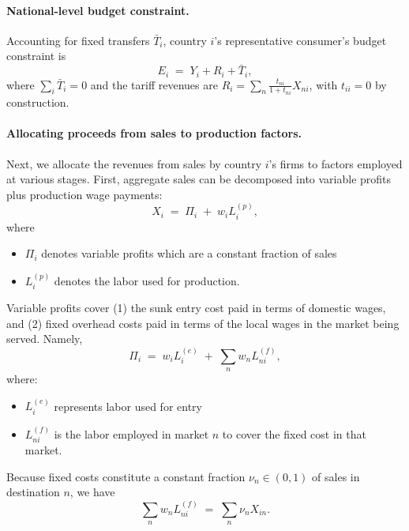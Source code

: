 \documentclass[12pt]{article}
\begin{document}
\paragraph{National-level budget constraint.}
Accounting for fixed transfers $\bar T_i$, country $i$'s representative consumer's budget constraint is
\begin{equation}
    E_i \;=\; Y_i + R_i + \bar T_i, 
    \label{eq:HH_budget}
\end{equation}
where $\sum_i \bar T_i = 0$ and the tariff revenues are $R_{i}=\sum_{n}\frac{t_{ni}}{1+t_{ni}}X_{ni}$, with $t_{ii}=0$ by construction.
\paragraph{Allocating proceeds from sales to production factors.}
Next, we allocate the revenues from sales by country $i$'s firms to factors employed at various stages. First, aggregate sales can be decomposed into variable profits plus production wage payments:
\begin{equation}
    X_i \;=\; \Pi_i \;+\; w_i L_i^{(p)},
    \label{eq:sales_split}
\end{equation}
where 
\begin{itemize}
    \item $\Pi_{i}$ denotes variable profits which are a constant fraction of sales
    \item $L_{i}^{(p)}$ denotes the labor used for production.
\end{itemize}
Variable profits cover (1) the sunk entry cost paid in terms of domestic wages, and (2) fixed overhead costs paid in terms of the local wages in the market being served. Namely,
\begin{equation}
    \Pi_i \;=\; w_i L_i^{(e)} \;+\; \sum_{n} w_n L_{ni}^{(f)},
    \label{eq:profits_split}
\end{equation}
where: 
\begin{itemize}
    \item $L_i^{(e)}$ represents labor used for entry
    \item $L_{ni}^{(f)}$ is the labor employed in market $n$ to cover the fixed cost in that market. 
\end{itemize}
Because fixed costs constitute a constant fraction $\nu_n\in(0,1)$ of sales in destination $n$, we have
\begin{equation}
    \sum_{n} w_n L_{ni}^{(f)} \;=\; \sum_{n} \nu_n X_{in}.
    \label{eq:fixedcost_prop}
\end{equation}
\end{document}
